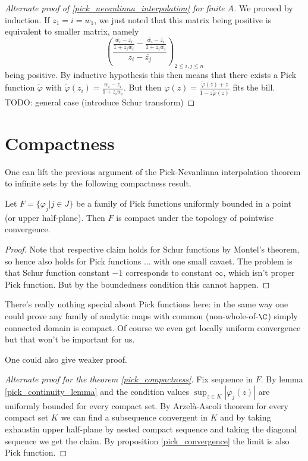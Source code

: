 \begin{proof}[Alternate proof of \ref{pick_nevanlinna_interpolation} for finite $A$]
	We proceed by induction. If $z_{1} = i = w_{1}$, we just noted that this matrix being positive is equivalent to smaller matrix, namely
	\[
		\left(\frac{\frac{w_{i} - z_{i}}{1 + z_{i} w_{i}} - \frac{\overline{w_{i}} - \overline{z_{i}}}{1 + \overline{z_{i}} \overline{w_{i}}}}{z_{i} - \overline{z_{j}}}\right)_{2 \leq i, j \leq n}
	\]
	being positive. By inductive hypothesis this then means that there exists a Pick function $\tilde{\varphi}$ with $\tilde{\varphi}(z_{i}) = \frac{w_{i} - z_{i}}{1 + z_{i} w_{i}}$. But then $\varphi(z) = \frac{\tilde{\varphi}(z) + z}{1 - z \tilde{\varphi}(z)}$ fits the bill. TODO: general case (introduce Schur transform)
\end{proof}

\section{Compactness}

One can lift the previous argument of the Pick-Nevanlinna interpolation theorem to infinite sets by the following compactness result.

\begin{lause}\label{pick_compactness}
	Let $F = \{\varphi_{j} | j \in J \}$ be a family of Pick functions uniformly bounded in a point (or upper half-plane). Then $F$ is compact under the topology of pointwise convergence.
\end{lause}
\begin{proof}
	Note that respective claim holds for Schur functions by Montel's theorem, so hence also holds for Pick functions $\ldots$ with one small cavaet. The problem is that Schur function constant $-1$ corresponds to constant $\infty$, which isn't proper Pick function. But by the boundedness condition this cannot happen.
\end{proof}

There's really nothing special about Pick functions here: in the same way one could prove any family of analytic maps with common (non-whole-of-$\C$) simply connected domain is compact. Of course we even get locally uniform convergence but that won't be important for us.

One could also give weaker proof.

\begin{proof}[Alternate proof for the theorem \ref{pick_compactness}]
	Fix sequence in $F$. By lemma \ref{pick_continuity_lemma} and the condition values $\sup_{z \in K}|\varphi_{j}(z)|$ are uniformly bounded for every compact set. By Arzel\`{a}-Ascoli theorem for every compact set $K$ we can find a subsequence convergent in $K$ and by taking exhaustin upper half-plane by nested compact sequence and taking the diagonal sequence we get the claim. By proposition \ref{pick_convergence} the limit is also Pick function.
\end{proof}

